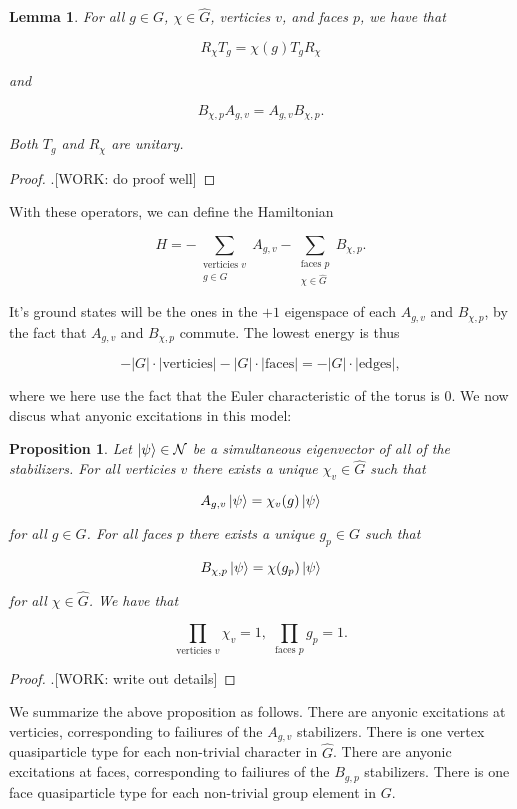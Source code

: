 \documentclass{article}
\newtheorem{lemma}{Lemma}
\newtheorem{proposition}{Proposition}
\theoremstyle{definition}
\numberwithin{figure}{section}
\begin{document}
\begin{lemma} For all $g\in G$, $\chi\in \widehat{G}$, verticies $v$, and faces $p$, we have that

$$R_{\chi}T_g=\chi(g) T_gR_\chi$$

and

$$B_{\chi,p}A_{g,v}=A_{g,v}B_{\chi,p}.$$

Both $T_g$ and $R_\chi$ are unitary.
\end{lemma}
\begin{proof}.[WORK: do proof well]
\end{proof}

With these operators, we can define the Hamiltonian

$$H=-\sum_{\substack{\text{verticies }v \\ g\in G}}A_{g,v} - \sum_{\substack{\text{faces }p \\ \chi \in \widehat{G}}}B_{\chi,p}.$$

It's ground states will be the ones in the $+1$ eigenspace of each $A_{g,v}$ and $B_{\chi,p}$, by the fact that $A_{g,v}$ and $B_{\chi,p}$ commute. The lowest energy is thus

$$-|G| \cdot |\text{verticies}|-|G|\cdot |\text{faces}|=-|G|\cdot |\text{edges}|,$$

where we here use the fact that the Euler characteristic of the torus is $0$. We now discus what anyonic excitations in this model:

\begin{proposition} Let $\left|\psi\right>\in\mathcal{N}$ be a simultaneous eigenvector of all of the stabilizers. For all verticies $v$ there exists a unique $\chi_{v}\in \widehat{G}$ such that

$$A_{g,v}\left|\psi\right> = \chi_{v}(g)\left|\psi\right>$$

for all $g\in G$. For all faces $p$ there exists a unique $g_p\in G$ such that

$$B_{\chi,p}\left|\psi\right>=\chi(g_p)\left|\psi\right>$$

for all $\chi\in \widehat{G}$. We have that

$$\prod_{\text{verticies }v}\chi_v=1,\,\, \prod_{\text{faces }p}g_p=1.$$
\end{proposition}
\begin{proof}.[WORK: write out details]
\end{proof}

We summarize the above proposition as follows. There are anyonic excitations at verticies, corresponding to failiures of the $A_{g,v}$ stabilizers. There is one vertex quasiparticle type for each non-trivial character in $\widehat{G}$. There are anyonic excitations at faces, corresponding to failiures of the $B_{g,p}$ stabilizers. There is one face quasiparticle type for each non-trivial group element in $G$.
\end{document}
